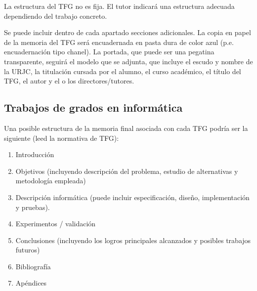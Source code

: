 La estructura del TFG no es fija. El tutor indicará una estructura adecuada dependiendo del trabajo concreto.

Se puede incluir dentro de cada apartado secciones adicionales. La copia en papel de la memoria del TFG será encuadernada en pasta dura de color azul (p.e. encuadernación tipo chanel). La portada, que puede ser una pegatina transparente, seguirá el modelo que se adjunta, que incluye el escudo y nombre de la URJC, la titulación cursada por el alumno, el curso académico, el título del TFG, el autor y el o los directores/tutores.


\subsection{Trabajos de grados en informática}

Una posible estructura de la memoria final asociada con cada TFG podría ser la siguiente (leed la normativa de TFG):
\begin{enumerate}
 \item Introducción
 \item Objetivos (incluyendo descripción del problema, estudio de alternativas y metodología empleada)
 \item Descripción informática (puede incluir especificación, diseño, implementación y pruebas).
 \item Experimentos / validación
 \item Conclusiones (incluyendo los logros principales alcanzados y posibles trabajos futuros)
 \item Bibliografía
 \item Apéndices
\end{enumerate}
